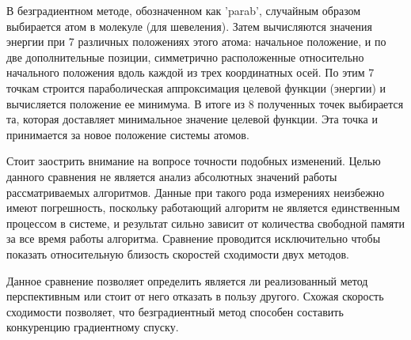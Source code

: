   В безградиентном методе, обозначенном как 'parab', случайным образом выбирается атом в молекуле (для шевеления). Затем вычисляются значения энергии при 7 различных положениях этого атома: начальное положение, и по две дополнительные позиции, симметрично расположенные относительно начального положения вдоль каждой из трех координатных осей. По этим 7 точкам строится параболическая аппроксимация целевой функции (энергии) и вычисляется положение ее минимума. В итоге из 8 полученных точек выбирается та, которая доставляет минимальное значение целевой функции. Эта точка и принимается за новое положение системы атомов. 
  \iffalse
  По каждой из осей проводится экстраполяция параболой в зависимости от минимума которой и определяется возможная длина шага вдоль данной оси. После из полученных минимумов выбирается наименьший по значению энергии, который и используется для смещения выбранного атома. Иллюстрация одной итерации подобного подхода изображена на рис. \ref{figParab}. 
  \fi
  \iffalse
  При выборе направления и величины шага во внимание принимается также и точность предсказания параболой -- получаемая величина шага не должна в абсолютном значении значительно превосходить начальные значения шага, она должна уточнить его. Корректное поведение продемонстрировано на 
  рис. \ref{figParab}. 
  В случаях, когда все используемые вдоль одной из осей точки, например, расположены на одной ветви параболы -- для шага используется значение, соответствующее минимуму энергии из начальных точек на этой оси.


  \begin{figure}
  	\begin{center}
  		\texttt{[image: parabola\_3d\_3\_crop.png]}
  	\end{center}
  	\caption{Визуализация поиска оптимального значения смещения атома, $h$ -- величина шага, $h_{opt}$ -- оптимальное смещение}
  	\label{figParab}
  \end{figure} 
  \fi

  \iffalse
  Стоит заострить внимание на вопросе точности подобных изменений. Целью данного сравнения не является анализ абсолютных значений работы рассматриваемых алгоритмов. Данные при такого рода измерениях неизбежно имеют погрешность, поскольку работающий алгоритм не является единственным процессом в системе, и результат сильно зависит от количества свободной памяти за все время работы алгоритма. Сравнение проводится исключительно чтобы показать относительную близость скоростей сходимости двух методов.

  Данное сравнение позволяет определить является ли реализованный метод перспективным или стоит от него отказать в пользу другого. Схожая скорость сходимости позволяет, что безградиентный метод способен составить конкуренцию градиентному спуску.


